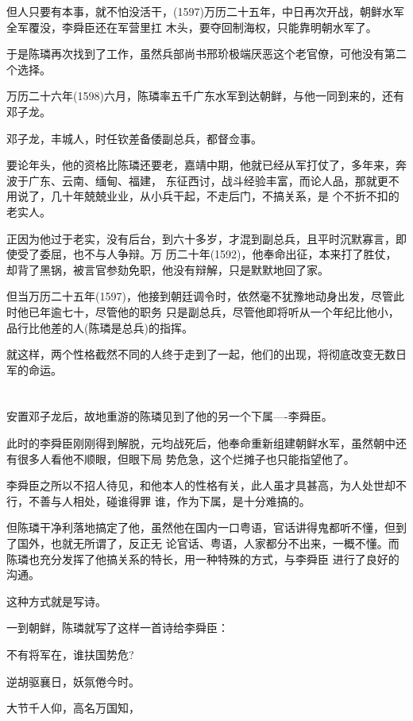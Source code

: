 \documentclass[11pt,a4paper,onecolumn]{article}
\begin{document}
但人只要有本事，就不怕没活干，(1597)万历二十五年，中日再次开战，朝鲜水军全军覆没，李舜臣还在军营里扛
木头，要夺回制海权，只能靠明朝水军了。

于是陈璘再次找到了工作，虽然兵部尚书邢玠极端厌恶这个老官僚，可他没有第二个选择。

万历二十六年(1598)六月，陈璘率五千广东水军到达朝鲜，与他一同到来的，还有邓子龙。

邓子龙，丰城人，时任钦差备倭副总兵，都督佥事。

要论年头，他的资格比陈璘还要老，嘉靖中期，他就已经从军打仗了，多年来，奔波于广东、云南、缅甸、福建，
东征西讨，战斗经验丰富，而论人品，那就更不用说了，几十年兢兢业业，从小兵干起，不走后门，不搞关系，是
个不折不扣的老实人。

正因为他过于老实，没有后台，到六十多岁，才混到副总兵，且平时沉默寡言，即使受了委屈，也不与人争辩。万
历二十年(1592)，他奉命出征，本来打了胜仗，却背了黑锅，被言官参劾免职，他没有辩解，只是默默地回了家。

但当万历二十五年(1597)，他接到朝廷调令时，依然毫不犹豫地动身出发，尽管此时他已年逾七十，尽管他的职务
只是副总兵，尽管他即将听从一个年纪比他小，品行比他差的人(陈璘是总兵)的指挥。

就这样，两个性格截然不同的人终于走到了一起，他们的出现，将彻底改变无数日军的命运。

\section[\thesection]{}

安置邓子龙后，故地重游的陈璘见到了他的另一个下属----李舜臣。

此时的李舜臣刚刚得到解脱，元均战死后，他奉命重新组建朝鲜水军，虽然朝中还有很多人看他不顺眼，但眼下局
势危急，这个烂摊子也只能指望他了。

李舜臣之所以不招人待见，和他本人的性格有关，此人虽才具甚高，为人处世却不行，不善与人相处，碰谁得罪
谁，作为下属，是十分难搞的。

但陈璘干净利落地搞定了他，虽然他在国内一口粤语，官话讲得鬼都听不懂，但到了国外，也就无所谓了，反正无
论官话、粤语，人家都分不出来，一概不懂。而陈璘也充分发挥了他搞关系的特长，用一种特殊的方式，与李舜臣
进行了良好的沟通。

这种方式就是写诗。

一到朝鲜，陈璘就写了这样一首诗给李舜臣：

不有将军在，谁扶国势危?

逆胡驱襄日，妖氛倦今时。

大节千人仰，高名万国知，
\end{document}
